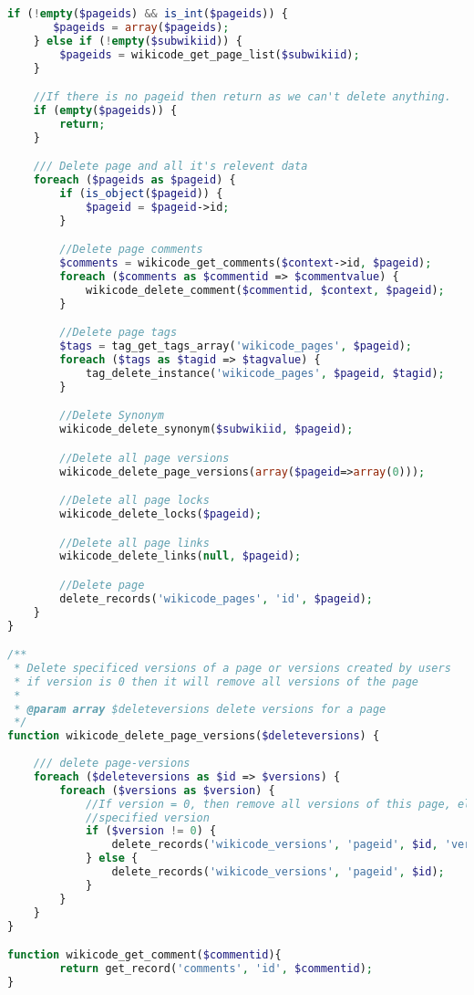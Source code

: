 \begin{lstlisting}[language=PHP]
    if (!empty($pageids) && is_int($pageids)) {
       $pageids = array($pageids);
    } else if (!empty($subwikiid)) {
        $pageids = wikicode_get_page_list($subwikiid);
    }

    //If there is no pageid then return as we can't delete anything.
    if (empty($pageids)) {
        return;
    }

    /// Delete page and all it's relevent data
    foreach ($pageids as $pageid) {
        if (is_object($pageid)) {
            $pageid = $pageid->id;
        }

        //Delete page comments
        $comments = wikicode_get_comments($context->id, $pageid);
        foreach ($comments as $commentid => $commentvalue) {
            wikicode_delete_comment($commentid, $context, $pageid);
        }

        //Delete page tags
        $tags = tag_get_tags_array('wikicode_pages', $pageid);
        foreach ($tags as $tagid => $tagvalue) {
            tag_delete_instance('wikicode_pages', $pageid, $tagid);
        }

        //Delete Synonym
        wikicode_delete_synonym($subwikiid, $pageid);

        //Delete all page versions
        wikicode_delete_page_versions(array($pageid=>array(0)));

        //Delete all page locks
        wikicode_delete_locks($pageid);

        //Delete all page links
        wikicode_delete_links(null, $pageid);

        //Delete page
		delete_records('wikicode_pages', 'id', $pageid);
    }
}

/**
 * Delete specificed versions of a page or versions created by users
 * if version is 0 then it will remove all versions of the page
 *
 * @param array $deleteversions delete versions for a page
 */
function wikicode_delete_page_versions($deleteversions) {
    
    /// delete page-versions
    foreach ($deleteversions as $id => $versions) {
        foreach ($versions as $version) {
            //If version = 0, then remove all versions of this page, else remove
            //specified version
            if ($version != 0) {
                delete_records('wikicode_versions', 'pageid', $id, 'version', $version);
            } else {
            	delete_records('wikicode_versions', 'pageid', $id);
			}
        }
    }
}

function wikicode_get_comment($commentid){
        return get_record('comments', 'id', $commentid);
}


\end{lstlisting}
